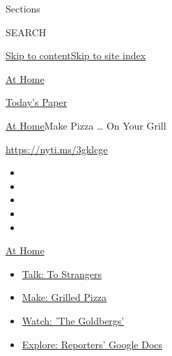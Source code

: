 Sections

SEARCH

\protect\hyperlink{site-content}{Skip to
content}\protect\hyperlink{site-index}{Skip to site index}

\href{https://www.nytimes3xbfgragh.onion/spotlight/at-home}{At Home}

\href{https://myaccount.nytimes3xbfgragh.onion/auth/login?response_type=cookie\&client_id=vi}{}

\href{https://www.nytimes3xbfgragh.onion/section/todayspaper}{Today's
Paper}

\href{/spotlight/at-home}{At Home}\textbar{}Make Pizza \ldots{} On Your
Grill

\url{https://nyti.ms/3gklcge}

\begin{itemize}
\item
\item
\item
\item
\item
\end{itemize}

\href{https://www.nytimes3xbfgragh.onion/spotlight/at-home?action=click\&pgtype=Article\&state=default\&region=TOP_BANNER\&context=at_home_menu}{At
Home}

\begin{itemize}
\tightlist
\item
  \href{https://www.nytimes3xbfgragh.onion/2020/08/03/well/family/the-benefits-of-talking-to-strangers.html?action=click\&pgtype=Article\&state=default\&region=TOP_BANNER\&context=at_home_menu}{Talk:
  To Strangers}
\item
  \href{https://www.nytimes3xbfgragh.onion/2020/08/01/at-home/coronavirus-make-pizza-on-a-grill.html?action=click\&pgtype=Article\&state=default\&region=TOP_BANNER\&context=at_home_menu}{Make:
  Grilled Pizza}
\item
  \href{https://www.nytimes3xbfgragh.onion/2020/07/31/arts/television/goldbergs-abc-stream.html?action=click\&pgtype=Article\&state=default\&region=TOP_BANNER\&context=at_home_menu}{Watch:
  'The Goldbergs'}
\item
  \href{https://www.nytimes3xbfgragh.onion/interactive/2020/at-home/even-more-reporters-editors-diaries-lists-recommendations.html?action=click\&pgtype=Article\&state=default\&region=TOP_BANNER\&context=at_home_menu}{Explore:
  Reporters' Google Docs}
\end{itemize}


